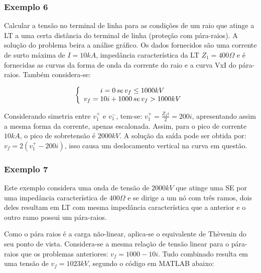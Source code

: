 \subsubsection*{Exemplo 6}

Calcular a tensão no terminal de linha para as condições de um raio que atinge a LT a uma certa distância do terminal de linha (proteção com pára-raios). A solução do problema beira a análise gráfico. Os dados fornecidos são uma corrente de surto máxima de $I = 10kA$, impedância característica da LT $Z_1=400\Omega$ e é fornecidas as curvas da forma de onda da corrente do raio e a curva VxI do pára-raios. Também considera-se:

\begin{equation} \label{exe:1}
\centering
\left \{
\begin{array}{cc}
i=0 \, se \, v_f \leq 1000kV \\
v_f = 10i+1000 \, se \, v_f > 1000kV\\
\end{array}
\right.
\end{equation}

Considerando simetria entre $v_1^{+}$ e $v_1^{-}$, tem-se: $v_1^{+}=\frac{Z_1i}{2}=200i$, apresentando assim a mesma forma da corrente, apenas escalonada. Assim, para o pico de corrente $10kA$, o pico de sobretensão é $2000kV$. A solução da saída pode ser obtida por: $v_f = 2(v_1^{+}-200i)$, isso causa um deslocamento vertical na curva em questão. 

\subsubsection*{Exemplo 7}

Este exemplo considera uma onda de tensão de $2000kV$ que atinge uma SE por uma impedância característica de $400 \Omega$ e se dirige a um nó com três ramos, dois deles resultam em LT com mesma impedância característica que a anterior e o outro ramo possui um pára-raios.

Como o pára raios é a carga não-linear, aplica-se o equivalente de Thèvenin do seu ponto de vista. Considera-se a mesma relação de tensão linear para o pára-raios que os problemas anteriores: $v_f = 1000-10i$. Tudo combinado resulta em uma tensão de $v_f = 1023kV$, segundo o código em MATLAB abaixo:



\newpage

